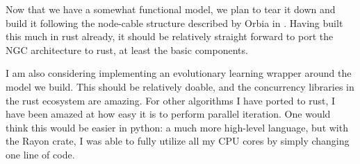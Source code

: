 \documentclass[12pt,english]{article}
\begin{document}
Now that we have a somewhat functional model, we plan to tear it down and build it following the node-cable structure described by Orbia in \cite{NGC}.
Having built this much in rust already, it should be relatively straight forward to port the NGC architecture to rust, at least the basic components.

I am also considering implementing an evolutionary learning wrapper around the model we build.
This should be relatively doable, and the concurrency libraries in the rust ecosystem are amazing.
For other algorithms I have ported to rust, I have been amazed at how easy it is to perform parallel iteration.
One would think this would be easier in python: a much more high-level language, but with the Rayon crate, I was able to fully utilize all my CPU cores by simply changing one line of code.





\lstlistoflistings
\end{document}
